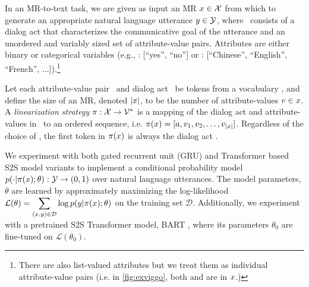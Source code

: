 In an MR-to-text task, we are given as input an MR $x \in \mathcal{X}$ from which
to generate an appropriate natural language utterance $y  \in \mathcal{Y}$, where
\mr~consists of a dialog act that characterizes the communicative goal of the
utterance and an unordered and variably sized set of attribute-value pairs.
Attributes are either binary or categorical variables (e.g.,
: [``yes'', ``no''] or : [``Chinese'',
``English'', ``French'', $\ldots$]).\footnote{There are also list-valued
attributes but we treat them as individual attribute-value pairs (i.e. in
\autoref{fig:exviggo}, both  and
 are in $x$.)}

Let each attribute-value pair \attr~and dialog act \da~be tokens from a
vocabulary \Attrs, and define the size of an MR, denoted  ${\lvert x \rvert}$,  to be
the number of attribute-values $v \in x$.  A \emph{linearization
strategy} $\pi : \mathcal{X} \rightarrow \mathcal{V}^*$ is a mapping of the dialog act
and attribute-values in \mr~to an ordered sequence, i.e.  $\pi(x) = [a,
v_1, v_2, \ldots, v_{{\lvert x \rvert}}]$.  Regardless of the choice of
\lin, the first token in $\pi(x)$ is always the dialog act \da.

We experiment with both gated recurrent unit (GRU) \cite{cho2014} and
Transformer \cite{vaswani2017} based S2S model variants to implement a
conditional probability model $p(\cdot| \pi(x); \theta) : \mathcal{Y}
\rightarrow (0, 1)$ over natural language utterances. The model parameters,
$\theta$ are learned by approximately maximizing the log-likelihood
$\displaystyle \mathcal{L}(\theta)= \sum_{(x,y)\in \mathcal{D}}  \log
p(y|\pi(x); \theta)$ on the training set $\mathcal{D}$.
Additionally, we experiment with a pretrained S2S Transformer model, BART
\cite{lewis2020}, where its parameters $\theta_0$ are fine-tuned on
$\mathcal{L}(\theta_0)$.

